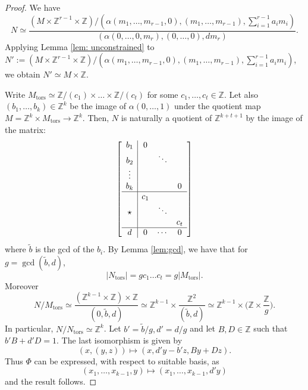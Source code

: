 \documentclass{article}
\def\Z{\mathbb{Z}}
\newcommand{\tors}{\mathrm{tors}}
\begin{document}
\begin{proof}
    We have 
    $$N \simeq \frac{(M \times \mathbb{Z}^{r-1} \times \mathbb{Z})/(\alpha(m_1, \ldots, m_{r-1}, 0), (m_1, \ldots, m_{r-1}), \sum_{i=1}^{r-1} a_i m_i)}{(\alpha(0, \ldots, 0, m_r), (0, \ldots, 0), dm_r)}.$$
    Applying Lemma \ref{lem: unconstrained} to $N' := (M \times \mathbb{Z}^{r-1} \times \mathbb{Z})/(\alpha(m_1, \ldots, m_{r-1}, 0), (m_1, \ldots, m_{r-1}), \sum_{i=1}^{r-1} a_i m_i)$, we obtain $N' \simeq M \times \mathbb{Z}$.

    Write $M_{\tors} \simeq \Z/(c_1) \times \ldots \times \Z/(c_t)$ for some $c_1,\ldots,c_t \in \Z$. Let also $(b_1,\ldots,b_k) \in \Z^k$ be the image of  $\alpha(0,\ldots, 1)$ under the quotient map 
    $M = \mathbb{Z}^k \times M_{\tors} \rightarrow \mathbb{Z}^k$.
    Then, $N$ is naturally a quotient of $\Z^{k+t+1}$ by the image of the matrix:
    \[
    \left[
    \begin{array}{c|ccc}
    b_1     & 0      &        &        \\
    b_2     &        & \ddots &        \\
    \vdots  &        &        &        \\
    b_k     &        &        & 0      \\
    \hline
            & c_1    &        &        \\
    \star   &        & \ddots &        \\
            &        &        & c_t    \\
    \hline
    d       & 0      & \cdots & 0
    \end{array}
    \right]
    \]
    where $\widetilde{b}$ is the gcd of the $b_i$. By Lemma \ref{lem:gcd}, we have that for $g = \operatorname{gcd}(\tilde{b}, d)$, $$|N_{\tors}| = g  c_1 \ldots c_t = g|M_{\tors}|.$$
    Moreover 
    $$N/M_{\tors} \simeq \frac{(\mathbb{Z}^{k-1} \times \mathbb{Z}) \times \mathbb{Z}}{(0, \tilde{b}, d)} \simeq \mathbb{Z}^{k-1} \times \frac{\mathbb{Z}^2}{(\tilde{b},d)} \simeq \mathbb{Z}^{k-1} \times \bigg(\mathbb{Z} \times \frac{\mathbb{Z}}{g}\bigg).$$
    In particular, $N/N_{\tors} \simeq \Z^k$. Let $b' = \tilde{b}/g, d' = d/g$ and let $B,D \in \mathbb{Z}$ such that $b'B + d'D = 1$. The last isomorphism is given by 
    $$(x, (y,z)) \mapsto (x, d'y-b'z, By+Dz).$$
    Thus $\Phi$ can be expressed, with respect to suitable basis, as
    $$(x_1, \ldots, x_{k-1}, y) \mapsto (x_1, \ldots, x_{k-1}, d'y)$$
     and the result follows. 
\end{proof}
\end{document}
